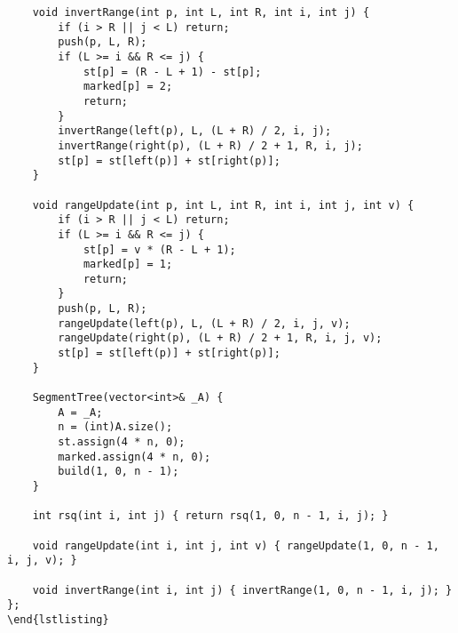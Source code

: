 \documentclass[11pt]{article}
\begin{document}
\begin{verbatim}
    void invertRange(int p, int L, int R, int i, int j) {
        if (i > R || j < L) return;
        push(p, L, R);
        if (L >= i && R <= j) {
            st[p] = (R - L + 1) - st[p];
            marked[p] = 2;
            return;
        }
        invertRange(left(p), L, (L + R) / 2, i, j);
        invertRange(right(p), (L + R) / 2 + 1, R, i, j);
        st[p] = st[left(p)] + st[right(p)];
    }

    void rangeUpdate(int p, int L, int R, int i, int j, int v) {
        if (i > R || j < L) return;
        if (L >= i && R <= j) {
            st[p] = v * (R - L + 1);
            marked[p] = 1;
            return;
        }
        push(p, L, R);
        rangeUpdate(left(p), L, (L + R) / 2, i, j, v);
        rangeUpdate(right(p), (L + R) / 2 + 1, R, i, j, v);
        st[p] = st[left(p)] + st[right(p)];
    }

    SegmentTree(vector<int>& _A) {
        A = _A;
        n = (int)A.size();
        st.assign(4 * n, 0);
        marked.assign(4 * n, 0);
        build(1, 0, n - 1);
    }

    int rsq(int i, int j) { return rsq(1, 0, n - 1, i, j); }

    void rangeUpdate(int i, int j, int v) { rangeUpdate(1, 0, n - 1, i, j, v); }

    void invertRange(int i, int j) { invertRange(1, 0, n - 1, i, j); }
};
\end{lstlisting}
\end{verbatim}
\end{document}
